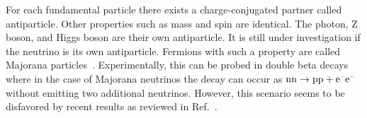 
For each fundamental particle there exists a charge-conjugated partner called antiparticle. Other properties such as mass and spin are identical. The photon, Z boson, and Higgs boson are their own antiparticle. It is still under investigation if the neutrino is its own antiparticle. Fermions with such a property are called Majorana particles~\cite{Majorana2006}. Experimentally, this can be probed in double beta decays where in the case of Majorana neutrinos the decay can occur as $\mathrm{nn}\to\mathrm{pp}+\mathrm{e}^{\rmminus}\mathrm{e}^{\rmminus}$ without emitting two additional neutrinos. However, this scenario seems to be disfavored by recent results as reviewed in Ref.~\cite{Dell'Oro:2016dbc}.


